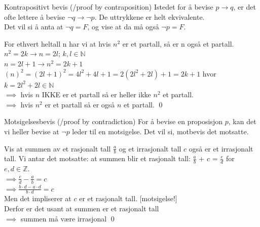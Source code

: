 \begin{frame}{Kontrapositivt bevis (/proof by contraposition)}
    Istedet for å bevise $p \rightarrow q$, er det ofte lettere å bevise $\lnot q \rightarrow \lnot p$. De uttrykkene er helt ekvivalente.\\
    Det vil si å anta at $\lnot q = F$, og vise at da må også $\lnot p = F$.\\
    
    \pause
    \begin{block}{For ethvert heltall n har vi at hvis $n^2$ er et partall, så er n også et partall.}
        $n^2=2k \rightarrow n=2l$;    $k,l\in\mathbb{N}$\\
    \pause
        $n=2l+1 \rightarrow n^2=2k+1$\\
        $(n)^2=(2l+1)^2=4l^2+4l+1=2(2l^2+2l)+1=2k+1$ hvor $k=2l^2+2l \in\mathbb{N}$\\
    \pause
        $\implies$ hvis $n$ IKKE er et partall så er heller ikke $n^2$ et partall.\\
        $\implies$ hvis $n^2$ er et partall så er også $n$ et partall.
        \qed
    \end{block}
\end{frame}

\begin{frame}{Motsigelsesbevis (/proof by contradiction)}
    For å bevise en proposisjon $p$, kan det vi heller bevise at $\lnot p$ leder til en motsigelse. Det vil si, motbevis det motsatte.
    
    \pause
    \begin{block}{Vis at summen av et rasjonalt tall $\frac{a}{b}$ og et irrasjonalt tall $c$ også er et irrasjonalt tall.}
    Vi antar det motsatte: at summen blir et rasjonalt tall: $\frac{a}{b}$ + $c$ = $\frac{e}{d}$ for $e, d \in \mathbb{Z}$.\\
    $\implies \frac{e}{d} - \frac{a}{b} = c$\\
    $\implies \frac{b\cdot d - a \cdot d}{b\cdot d} = c$\\
    Men det impliserer at $c$ er et rasjonalt tall. [motsigelse!]\\
    Derfor er det usant at summen er et rasjonalt tall\\
    $\implies$ summen må være irrasjonal
    \qed
    
    \end{block}
\end{frame}

